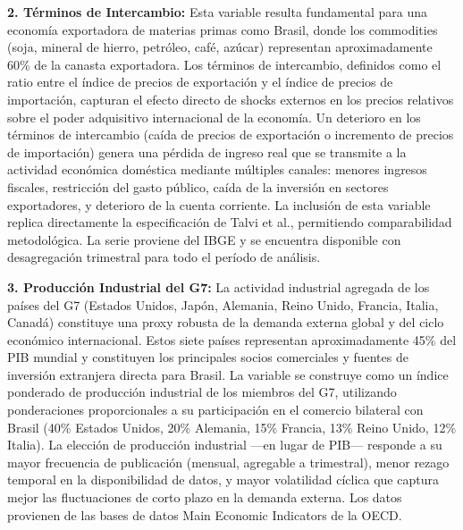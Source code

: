\documentclass[3p,11pt]{elsarticle}
\begin{document}
\textbf{2. Términos de Intercambio:} Esta variable resulta fundamental para una economía exportadora de materias primas como Brasil, donde los commodities (soja, mineral de hierro, petróleo, café, azúcar) representan aproximadamente 60\% de la canasta exportadora. Los términos de intercambio, definidos como el ratio entre el índice de precios de exportación y el índice de precios de importación, capturan el efecto directo de shocks externos en los precios relativos sobre el poder adquisitivo internacional de la economía. Un deterioro en los términos de intercambio (caída de precios de exportación o incremento de precios de importación) genera una pérdida de ingreso real que se transmite a la actividad económica doméstica mediante múltiples canales: menores ingresos fiscales, restricción del gasto público, caída de la inversión en sectores exportadores, y deterioro de la cuenta corriente. La inclusión de esta variable replica directamente la especificación de Talvi et al., permitiendo comparabilidad metodológica. La serie proviene del IBGE y se encuentra disponible con desagregación trimestral para todo el período de análisis.

\textbf{3. Producción Industrial del G7:} La actividad industrial agregada de los países del G7 (Estados Unidos, Japón, Alemania, Reino Unido, Francia, Italia, Canadá) constituye una proxy robusta de la demanda externa global y del ciclo económico internacional. Estos siete países representan aproximadamente 45\% del PIB mundial y constituyen los principales socios comerciales y fuentes de inversión extranjera directa para Brasil. La variable se construye como un índice ponderado de producción industrial de los miembros del G7, utilizando ponderaciones proporcionales a su participación en el comercio bilateral con Brasil (40\% Estados Unidos, 20\% Alemania, 15\% Francia, 13\% Reino Unido, 12\% Italia). La elección de producción industrial ---en lugar de PIB--- responde a su mayor frecuencia de publicación (mensual, agregable a trimestral), menor rezago temporal en la disponibilidad de datos, y mayor volatilidad cíclica que captura mejor las fluctuaciones de corto plazo en la demanda externa. Los datos provienen de las bases de datos Main Economic Indicators de la OECD.
\end{document}
